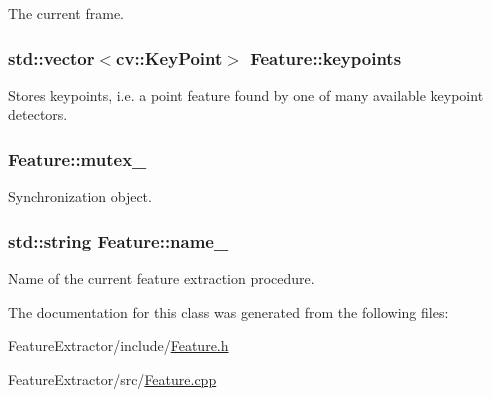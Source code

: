 The current frame. 

\hypertarget{class_feature_a7e1fc96f926cad9da3db0397a99c0079}{
\subsubsection[{keypoints}]{\setlength{\rightskip}{0pt plus 5cm}std\-::vector$<$cv\-::\-Key\-Point$>$ {\bf Feature\-::keypoints}}}\label{class_feature_a7e1fc96f926cad9da3db0397a99c0079}


Stores keypoints, i.\-e. a point feature found by one of many available keypoint detectors. 

\hypertarget{class_feature_a08499ba9b2c77ef9a29f97d6a8f66006}{
\subsubsection[{mutex\-\_\-}]{ {\bf Feature\-::mutex\-\_\-}}}\label{class_feature_a08499ba9b2c77ef9a29f97d6a8f66006}


Synchronization object. 

\hypertarget{class_feature_a46e9fc1f327aaafb10de2c0425d311aa}{
\subsubsection[{name\-\_\-}]{\setlength{\rightskip}{0pt plus 5cm}std\-::string {\bf Feature\-::name\-\_\-}}}\label{class_feature_a46e9fc1f327aaafb10de2c0425d311aa}


Name of the current feature extraction procedure. 



The documentation for this class was generated from the following files\-:\begin{DoxyCompactItemize}
\item 
Feature\-Extractor/include/\hyperlink{_feature_8h}{Feature.\-h}\item 
Feature\-Extractor/src/\hyperlink{_feature_8cpp}{Feature.\-cpp}\end{DoxyCompactItemize}
